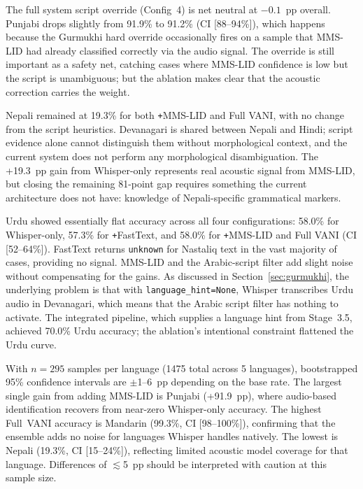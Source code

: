\documentclass[conference]{IEEEtran}
\begin{document}
The full system script override (Config~4) is net neutral at $-0.1$~pp overall. Punjabi drops slightly from 91.9\% to 91.2\% (CI [88--94\%]), which happens because the Gurmukhi hard override occasionally fires on a sample that MMS-LID had already classified correctly via the audio signal. The override is still important as a safety net, catching cases where MMS-LID confidence is low but the script is unambiguous; but the ablation makes clear that the acoustic correction carries the weight.

Nepali remained at 19.3\% for both \texttt{+}MMS-LID and Full VANI, with no change from the script heuristics. Devanagari is shared between Nepali and Hindi; script evidence alone cannot distinguish them without morphological context, and the current system does not perform any morphological disambiguation. The +19.3~pp gain from Whisper-only represents real acoustic signal from MMS-LID, but closing the remaining 81-point gap requires something the current architecture does not have: knowledge of Nepali-specific grammatical markers.

Urdu showed essentially flat accuracy across all four configurations: 58.0\% for Whisper-only, 57.3\% for \texttt{+}FastText, and 58.0\% for \texttt{+}MMS-LID and Full VANI (CI [52--64\%]). FastText returns \texttt{unknown} for Nastaliq text in the vast majority of cases, providing no signal. MMS-LID and the Arabic-script filter add slight noise without compensating for the gains. As discussed in Section~\ref{sec:gurmukhi}, the underlying problem is that with \texttt{language\_hint=None}, Whisper transcribes Urdu audio in Devanagari, which means that the Arabic script filter has nothing to activate. The integrated pipeline, which supplies a language hint from Stage~3.5, achieved 70.0\% Urdu accuracy; the ablation's intentional constraint flattened the Urdu curve.

With $n{=}295$ samples per language (1475 total across 5 languages), bootstrapped 95\% confidence intervals are $\pm$1--6~pp depending on the base rate. The largest single gain from adding MMS-LID is Punjabi (+91.9~pp), where audio-based identification recovers from near-zero Whisper-only accuracy. The highest Full~VANI accuracy is Mandarin (99.3\%, CI [98--100\%]), confirming that the ensemble adds no noise for languages Whisper handles natively. The lowest is Nepali (19.3\%, CI [15--24\%]), reflecting limited acoustic model coverage for that language. Differences of $\lesssim$5~pp should be interpreted with caution at this sample size.
\end{document}

